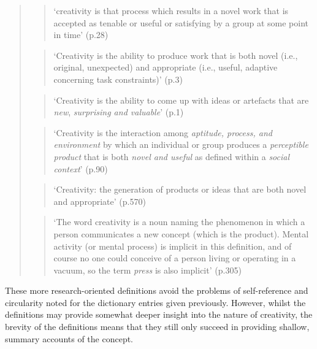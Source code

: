 \documentclass[10pt,letterpaper]{article}
\begin{document}
\begin{quotation}
\begin{quote}
 `creativity is that process which results in a novel work that is accepted as tenable or useful or satisfying by a group at some point in time' %
\cite{stein63} (p.28)
\end{quote}
\begin{quote}
`Creativity is the ability to produce work that is both novel (i.e., original, unexpected) and appropriate (i.e., useful, adaptive concerning task constraints)'
\cite{sternberg99a}(p.3)
\end{quote}
\begin{quote}
`Creativity is the ability to come up with ideas or artefacts that are {\em new}, {\em surprising and valuable}'
\cite{boden04}(p.1)
\end{quote}
\begin{quote}
`Creativity is the interaction among \emph{aptitude, process, and environment} by which an individual or group produces a \emph{perceptible product} that is both \emph{novel and useful} as defined within a \emph{social context}'
\cite{plucker04defn}(p.90)
\end{quote}
\begin{quote}
`Creativity: the generation of products or ideas that are both novel and appropriate' 
\cite{hennessey10}(p.570)
\end{quote}
\begin{quote}
`The word creativity is a noun naming the phenomenon in which a person communicates a new concept (which is the product). Mental activity (or mental process) is implicit in this definition, and of course no one could conceive of a person living or operating in a vacuum, so the term \emph{press} is also implicit'
\cite{rhodes61}(p.305)
\end{quote}
\end{quotation}

These more research-oriented definitions avoid the problems of self-reference and circularity noted for the dictionary entries given previously. However, whilst the definitions may provide somewhat deeper insight into the nature of creativity, the brevity of the definitions means that they still only succeed in providing shallow, summary accounts of the concept. 
\end{document}
